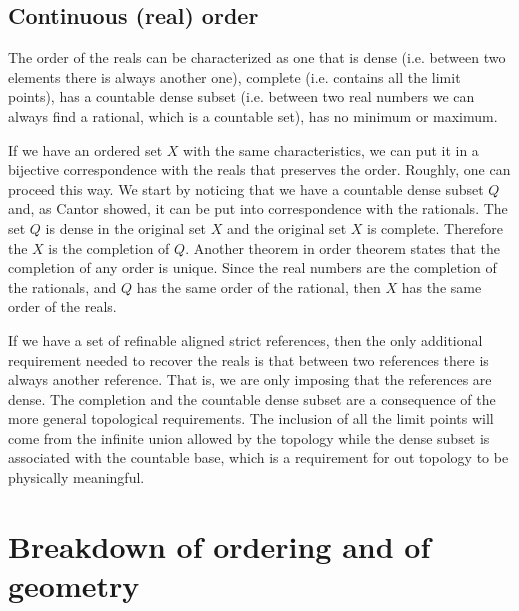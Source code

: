 \documentclass[12pt]{iopart}
\begin{document}
\subsection{Continuous (real) order}

The order of the reals can be characterized as one that is dense (i.e. between two elements there is always another one), complete (i.e. contains all the limit points), has a countable dense subset (i.e. between two real numbers we can always find a rational, which is a countable set), has no minimum or maximum. 

If we have an ordered set $X$ with the same characteristics, we can put it in a bijective correspondence with the reals that preserves the order. Roughly, one can proceed this way. We start by noticing that we have a countable dense subset $Q$ and, as Cantor showed, it can be put into correspondence with the rationals. The set $Q$ is dense in the original set $X$ and the original set $X$ is complete. Therefore the $X$ is the completion of $Q$. Another theorem in order theorem states that the completion of any order is unique. Since the real numbers are the completion of the rationals, and $Q$ has the same order of the rational, then $X$ has the same order of the reals.

If we have a set of refinable aligned strict references, then the only additional requirement needed to recover the reals is that between two references there is always another reference. That is, we are only imposing that the references are dense. The completion and the countable dense subset are a consequence of the more general topological requirements. The inclusion of all the limit points will come from the infinite union allowed by the topology while the dense subset is associated with the countable base, which is a requirement for out topology to be physically meaningful.

\section{Breakdown of ordering and of geometry}
\end{document}
